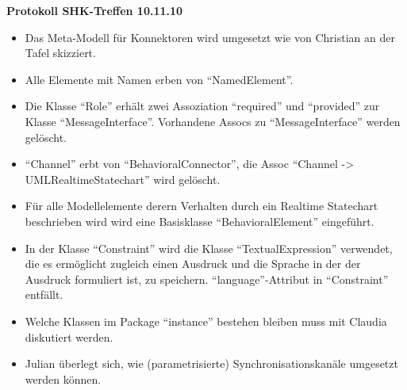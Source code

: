 \documentclass[11pt,a4paper]{article}
\begin{document}
\begin{center}

\textbf{\huge Protokoll SHK-Treffen 10.11.10}\\[0.9cm]

\end{center}

\begin{itemize}
  \item Das Meta-Modell für Konnektoren wird umgesetzt wie von Christian an der
  Tafel skizziert.
  \item Alle Elemente mit Namen erben von ``NamedElement''.
  \item Die Klasse ``Role'' erhält zwei Assoziation ``required'' und
  ``provided'' zur Klasse ``MessageInterface''. Vorhandene Assocs zu
  ``MessageInterface'' werden gelöscht.
  \item ``Channel'' erbt von ``BehavioralConnector'', die Assoc ``Channel ->
  UMLRealtimeStatechart'' wird gelöscht.
  \item Für alle Modellelemente derern Verhalten durch ein Realtime Statechart
  beschrieben wird wird eine Basisklasse ``BehavioralElement'' eingeführt.
  \item In der Klasse ``Constraint'' wird die Klasse ``TextualExpression''
  verwendet, die es ermöglicht zugleich einen Ausdruck und die Sprache in der
  der Ausdruck formuliert ist, zu speichern. ``language''-Attribut in
  ``Constraint'' entfällt.
  \item Welche Klassen im Package ``instance'' bestehen bleiben muss mit Claudia
  diskutiert werden.
  \item Julian überlegt sich, wie (parametrisierte) Synchronisationskanäle
  umgesetzt werden können.
\end{itemize}
\end{document}

